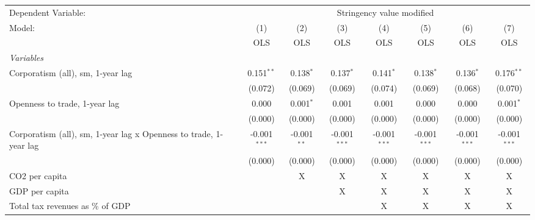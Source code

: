 
\begingroup
\centering
\begin{tabular}{lccccccc}
   \toprule
   Dependent Variable: & \multicolumn{7}{c}{Stringency value modified}\\
   Model:                                                            & (1)            & (2)           & (3)            & (4)            & (5)            & (6)            & (7)\\  
                                                                     &  OLS           & OLS           & OLS            & OLS            & OLS            & OLS            & OLS\\  
   \midrule
   \emph{Variables}\\
   Corporatism (all), sm, 1-year lag                                 & 0.151$^{**}$   & 0.138$^{*}$   & 0.137$^{*}$    & 0.141$^{*}$    & 0.138$^{*}$    & 0.136$^{*}$    & 0.176$^{**}$\\   
                                                                     & (0.072)        & (0.069)       & (0.069)        & (0.074)        & (0.069)        & (0.068)        & (0.070)\\   
   Openness to trade, 1-year lag                                     & 0.000          & 0.001$^{*}$   & 0.001          & 0.001          & 0.000          & 0.000          & 0.001$^{*}$\\   
                                                                     & (0.000)        & (0.000)       & (0.000)        & (0.000)        & (0.000)        & (0.000)        & (0.000)\\   
   Corporatism (all), sm, 1-year lag x Openness to trade, 1-year lag & -0.001$^{***}$ & -0.001$^{**}$ & -0.001$^{***}$ & -0.001$^{***}$ & -0.001$^{***}$ & -0.001$^{***}$ & -0.001$^{***}$\\   
                                                                     & (0.000)        & (0.000)       & (0.000)        & (0.000)        & (0.000)        & (0.000)        & (0.000)\\   
   CO2 per capita                                                    &                & X             & X              & X              & X              & X              & X\\  
   GDP per capita                                                    &                &               & X              & X              & X              & X              & X\\  
   Total tax revenues as \% of GDP                                   &                &               &                & X              & X              & X              & X\\  

\end{tabular}
